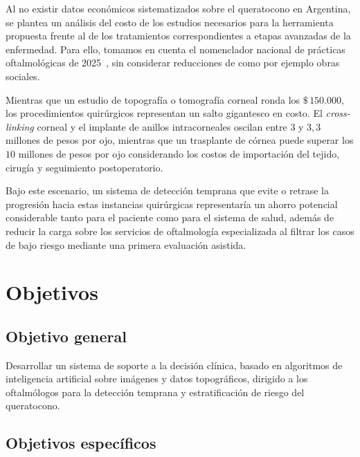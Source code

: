         Al no existir datos económicos sistematizados sobre el queratocono en Argentina, se plantea un análisis del costo de los estudios necesarios para la herramienta propuesta frente al de los tratamientos correspondientes a etapas avanzadas de la enfermedad. Para ello, tomamos en cuenta el nomenclador nacional de prácticas oftalmológicas de 2025~, sin considerar reducciones de como por ejemplo obras sociales.
        
        Mientras que un estudio de topografía o tomografía corneal ronda los $\$\,150.000$, los procedimientos quirúrgicos representan un salto gigantesco en costo. El \textit{cross-linking} corneal y el implante de anillos intracorneales oscilan entre $3$ y $3,3$ millones de pesos por ojo, mientras que un trasplante de córnea puede superar los $10$ millones de pesos por ojo considerando los costos de importación del tejido, cirugía y seguimiento postoperatorio. 
        
        Bajo este escenario, un sistema de detección temprana que evite o retrase la progresión hacia estas instancias quirúrgicas representaría un ahorro potencial considerable tanto para el paciente como para el sistema de salud, además de reducir la carga sobre los servicios de oftalmología especializada al filtrar los casos de bajo riesgo mediante una primera evaluación asistida.

\par\vspace{-0.4 cm}
\section{Objetivos}

    \par\vspace{-0.15 cm}
    \subsection*{Objetivo general}
    
        Desarrollar un sistema de soporte a la decisión clínica, basado en algoritmos de inteligencia artificial sobre imágenes y datos topográficos, dirigido a los oftalmólogos para la detección temprana y estratificación de riesgo del queratocono.

    \par\vspace{-0.15 cm}
    \subsection*{Objetivos específicos}
    
